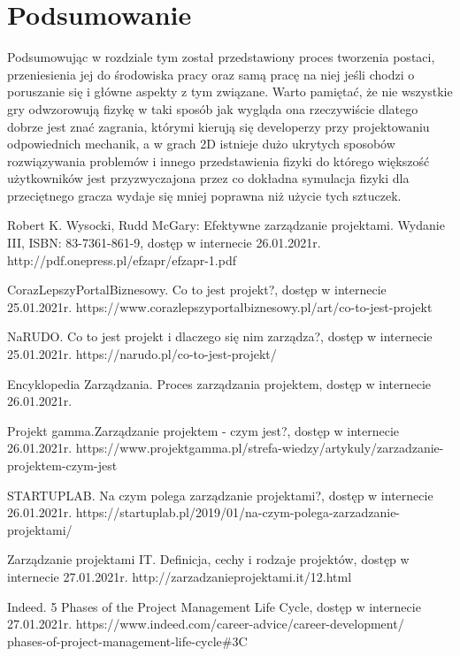 \documentclass[oneside,polski,logo]{amuthesis}
\begin{document}
\section{Podsumowanie}
Podsumowując w rozdziale tym został przedstawiony proces tworzenia postaci, przeniesienia jej do środowiska pracy oraz samą pracę na niej jeśli chodzi o poruszanie się i główne aspekty z tym związane. Warto pamiętać, że nie wszystkie gry odwzorowują fizykę w taki sposób jak wygląda ona rzeczywiście dlatego dobrze jest znać zagrania, którymi kierują się developerzy przy projektowaniu odpowiednich mechanik, a w grach 2D istnieje dużo ukrytych sposobów rozwiązywania problemów i innego przedstawienia fizyki do którego większość użytkowników jest przyzwyczajona przez co dokładna symulacja fizyki dla przeciętnego gracza wydaje się mniej poprawna niż użycie tych sztuczek.
\begin{thebibliography}{7}

Robert K. Wysocki, Rudd McGary: Efektywne zarządzanie projektami. Wydanie III, ISBN: 83-7361-861-9, dostęp w internecie 26.01.2021r.
http://pdf.onepress.pl/efzapr/efzapr-1.pdf

CorazLepszyPortalBiznesowy. Co to jest projekt?, dostęp w internecie 25.01.2021r.
https://www.corazlepszyportalbiznesowy.pl/art/co-to-jest-projekt

NaRUDO. Co to jest projekt i dlaczego się nim zarządza?, dostęp w internecie 25.01.2021r.
https://narudo.pl/co-to-jest-projekt/

Encyklopedia Zarządzania. Proces zarządzania projektem, dostęp w internecie 26.01.2021r.

Projekt gamma.Zarządzanie projektem - czym jest?, dostęp w internecie 26.01.2021r.
https://www.projektgamma.pl/strefa-wiedzy/artykuly/zarzadzanie-projektem-czym-jest

STARTUPLAB. Na czym polega zarządzanie projektami?, dostęp w internecie 26.01.2021r.
https://startuplab.pl/2019/01/na-czym-polega-zarzadzanie-projektami/

Zarządzanie projektami IT. Definicja, cechy i rodzaje projektów, dostęp w internecie 27.01.2021r.
http://zarzadzanieprojektami.it/12.html

Indeed. 5 Phases of the Project Management Life Cycle, dostęp w internecie 27.01.2021r.
https://www.indeed.com/career-advice/career-development/\\phases-of-project-management-life-cycle\#3C


\end{thebibliography}
\end{document}
